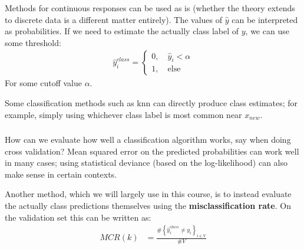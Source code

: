 \documentclass[xetex,mathserif,serif,aspectratio=169]{beamer}
\begin{document}
\begin{frame}[fragile] \frametitle{} \oldB \small

\textbf{}

Methods for continuous responses can be used as is (whether the
theory extends to discrete data is a different matter entirely).
The values of $\widehat{y}$ can be interpreted as probabilities. If
we need to estimate the actually class label of $y$, we can use
some threshold:
\begin{align*}
\widehat{y}_i^{class} = \left\{ \begin{array}{c} 0, \quad \widehat{y}_i < \alpha \\ 1, \quad \text{else} \end{array} \right.
\end{align*}
For some cutoff value $\alpha$.

\pause Some classification methods such as knn can directly produce
class estimates; for example, simply using whichever class
label is most common near $x_{new}$.

\end{frame}

\begin{frame}[fragile] \frametitle{} \oldB \small

\textbf{}

How can we evaluate how well a classification algorithm works, say when
doing cross validation? Mean squared error on the predicted probabilities
can work well in many cases; using statistical deviance (based on the log-likelihood)
can also make sense in certain contexts.

Another method, which we will largely use in this course, is
to instead evaluate the actually class predictions themselves using
the \textbf{misclassification rate}. On the validation set this
can be written as:
\begin{align*}
MCR(k) &= \frac{\#\left\{\widehat{y}_i^{class} \neq y_i\right\}_{i \in V}}{\#V}
\end{align*}

\end{frame}
\end{document}
